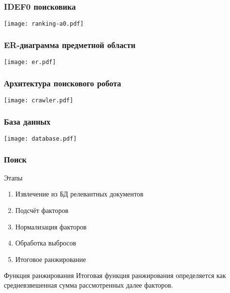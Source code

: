 \documentclass[hyperref={unicode}, 14pt]{beamer}
\begin{document}
\begin{frame}
  \frametitle{IDEF0 поисковика}

  \begin{center}
    \texttt{[image: ranking-a0.pdf]}
  \end{center}
\end{frame}

\begin{frame}
  \frametitle{ER-диаграмма предметной области}

  \begin{center}
    \texttt{[image: er.pdf]}
  \end{center}
\end{frame}

\begin{frame}
  \frametitle{Архитектура поискового робота}

  \begin{center}
    \texttt{[image: crawler.pdf]}
  \end{center}
\end{frame}

\begin{frame}
  \frametitle{База данных}

  \begin{center}
    \texttt{[image: database.pdf]}
  \end{center}
\end{frame}

\begin{frame}
  \frametitle{Поиск}

  \begin{block}{Этапы}
    \begin{enumerate}
      \item Извлечение из БД релевантных документов
      \item Подсчёт факторов
      \item Нормализация факторов
      \item Обработка выбросов
      \item Итоговое ранжирование
    \end{enumerate}
  \end{block}

  \begin{block}{Функция ранжирования}
    Итоговая функция ранжирования определяется как средневзвешенная сумма рассмотренных далее факторов.
  \end{block}
\end{frame}
\end{document}
